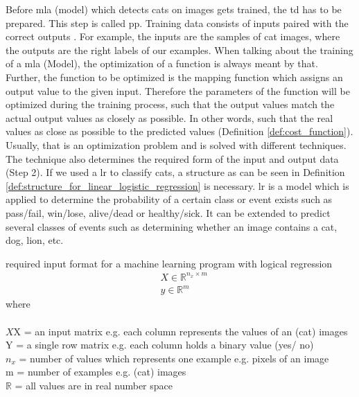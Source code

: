 Before \gls{mla} (model) which detects cats on images gets trained, the \Gls{td} has to be prepared. This step is called \Gls{pp}. Training data consists of inputs paired with the correct outputs \cite{brownlee2019deep}. For example, the inputs are the samples of cat images, where the outputs are the right labels of our examples. When talking about the training of a \gls{mla} (Model), the optimization of a function is always meant by that. Further, the function to be optimized is the mapping function which assigns an output value to the given input. Therefore the parameters of the function will be optimized during the training process, such that the output values match the actual output values as closely as possible. In other words, such that the real values as close as possible to the predicted values  (Definition \ref{def:cost_function}). Usually, that is an optimization problem and is solved with different techniques. The technique also determines the required form of the input and output data (Step 2). If we used a \Gls{lr} to classify cats, a structure as can be seen in Definition \ref{def:structure_for_linear_logistic_regression} is necessary. \gls{lr} is a model which is applied to determine the probability of a certain class or event exists such as pass/fail, win/lose, alive/dead or healthy/sick. It can be extended to predict several classes of events such as determining whether an image contains a cat, dog, lion, etc.

\begin{definition}[label=def:structure_for_linear_logistic_regression]{required input format for a machine learning program with logical regression}
	\begin{align*}
	& X \in \mathbb{R}^{n_{x}\times m}  \\
	& y \in \mathbb{R}^{m}
	\end{align*}
	where \\\\
	\( X \)X = an input matrix e.g. each column represents the values of an (cat) images\\
	Y = a single row matrix e.g. each column holds a binary value (yes/ no)\\
	\( n_{x} \) = number of values which represents one example e.g. pixels of an image \\
	m = number of examples e.g. (cat) images \\
	\( \mathbb{R} \) = all values are in real number space \\
\end{definition}

